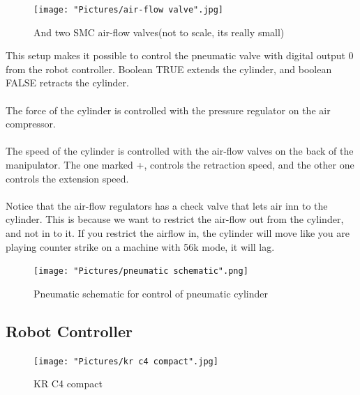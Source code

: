 \documentclass{article}
\begin{document}
        \begin{figure}[!h]
            \centering
            \texttt{[image: "Pictures/air-flow valve".jpg]}
            \caption{And two SMC air-flow valves(not to scale, its really small)}
        \end{figure}
        
\newpage

        This setup makes it possible to control the pneumatic valve with digital output 0 from the robot controller. Boolean TRUE extends the cylinder, and boolean FALSE retracts the cylinder. 
        \\\\
        The force of the cylinder is controlled with the pressure regulator on the air compressor. 
        \\\\
        The speed of the cylinder is controlled with the air-flow valves on the back of the manipulator. The one marked +, controls the retraction speed, and the other one controls the extension speed.
        \\\\
          Notice that the air-flow regulators has a check valve that lets air inn to the cylinder. This is because we want to restrict the air-flow out from the cylinder, and not in to it. If you restrict the airflow in, the cylinder will move like you are playing counter strike on a machine with 56k mode, it will lag. 
        
        \begin{figure}
            \centering
            \texttt{[image: "Pictures/pneumatic schematic".png]}
            \caption{Pneumatic schematic for control of pneumatic cylinder}
        \end{figure}
    
\newpage

        \subsection{Robot Controller}
        
        \begin{figure}[!h]
            \centering
            \texttt{[image: "Pictures/kr c4 compact".jpg]}
            \caption{KR C4 compact}
        \end{figure}
        
\end{document}
